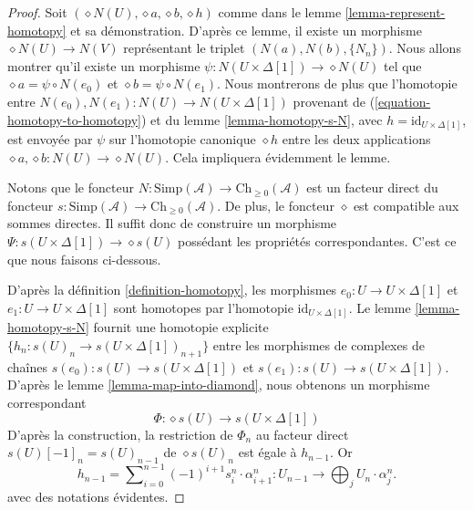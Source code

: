 \begin{proof}
Soit $(\diamond N(U), \diamond a, \diamond b, \diamond h)$ comme dans le
lemme \ref{lemma-represent-homotopy} et sa démonstration. D'après ce lemme,
il existe un morphisme $\diamond N(U) \to N(V)$ représentant le triplet
$(N(a), N(b), \{N_n\})$. Nous allons montrer qu'il existe un morphisme
$\psi : N(U \times \Delta[1]) \to \diamond{N(U)}$
tel que $\diamond a = \psi \circ N(e_0)$ et
$\diamond b = \psi \circ N(e_1)$. Nous montrerons de plus que l'homotopie entre
$N(e_0), N(e_1) :
N(U) \to N(U \times \Delta[1])$ provenant de
(\ref{equation-homotopy-to-homotopy}) et du
lemme \ref{lemma-homotopy-s-N}, avec
$h = \text{id}_{U \times \Delta[1]}$, est envoyée par
$\psi$ sur l'homotopie canonique $\diamond h$ entre les deux applications
$\diamond a, \diamond b : N(U) \to \diamond{N(U)}$.
Cela impliquera évidemment le lemme.

\medskip\noindent
Notons que le foncteur
$N : \text{Simp}(\mathcal{A}) \to \text{Ch}_{\geq 0}(\mathcal{A})$ est un
facteur direct du foncteur
$s : \text{Simp}(\mathcal{A}) \to \text{Ch}_{\geq 0}(\mathcal{A})$.
De plus, le foncteur $\diamond$ est compatible aux sommes directes.
Il suffit donc de construire un morphisme
$\Psi : s(U \times \Delta[1]) \to \diamond{s(U)}$ possédant les propriétés
correspondantes. C'est ce que nous faisons ci-dessous.

\medskip\noindent
D'après la définition \ref{definition-homotopy}, les morphismes
$e_0 : U \to U \times \Delta[1]$ et $e_1 : U \to U \times \Delta[1]$
sont homotopes par l'homotopie $\text{id}_{U \times \Delta[1]}$.
Le lemme \ref{lemma-homotopy-s-N} fournit une homotopie explicite
$\{h_n : s(U)_n \to s(U \times \Delta[1])_{n + 1}\}$
entre les morphismes de complexes de chaînes
$s(e_0) : s(U) \to s(U \times \Delta[1])$ et
$s(e_1) : s(U) \to s(U \times \Delta[1])$. D'après le
lemme \ref{lemma-map-into-diamond}, nous obtenons un morphisme correspondant
$$
\Phi : \diamond{s(U)} \to s(U \times \Delta[1])
$$
D'après la construction, la restriction de $\Phi_n$ au facteur direct
$s(U)[-1]_n = s(U)_{n - 1}$ de $\diamond{s(U)}_n$ est égale à
$h_{n - 1}$. Or
$$
h_{n - 1} = \sum\nolimits_{i = 0}^{n - 1}
(-1)^{i + 1} s^n_i \cdot \alpha^n_{i + 1} :
U_{n - 1} \to \bigoplus\nolimits_j U_n \cdot \alpha^n_j.
$$
avec des notations évidentes.


\end{proof}
